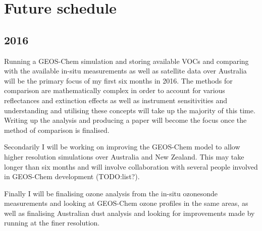 \section{Future schedule}

\subsection{2016}

Running a GEOS-Chem simulation and storing available VOCs and comparing with the available in-situ measurements as well as satellite data over Australia will be the primary focus of my first six months in 2016.
The methods for comparison are mathematically complex in order to account for various reflectances and extinction effects as well as instrument sensitivities and understanding and utilising these concepts will take up the majority of this time.
Writing up the analysis and producing a paper will become the focus once the method of comparison is finalised.

Secondarily I will be working on improving the GEOS-Chem model to allow higher resolution simulations over Australia and New Zealand.
This may take longer than six months and will involve collaboration with several people involved in GEOS-Chem development (TODO:list?).

Finally I will be finalising ozone analysis from the in-situ ozonesonde measurements and looking at GEOS-Chem ozone profiles in the same areas, as well as finalising Australian dust analysis and looking for improvements made by running at the finer resolution.
